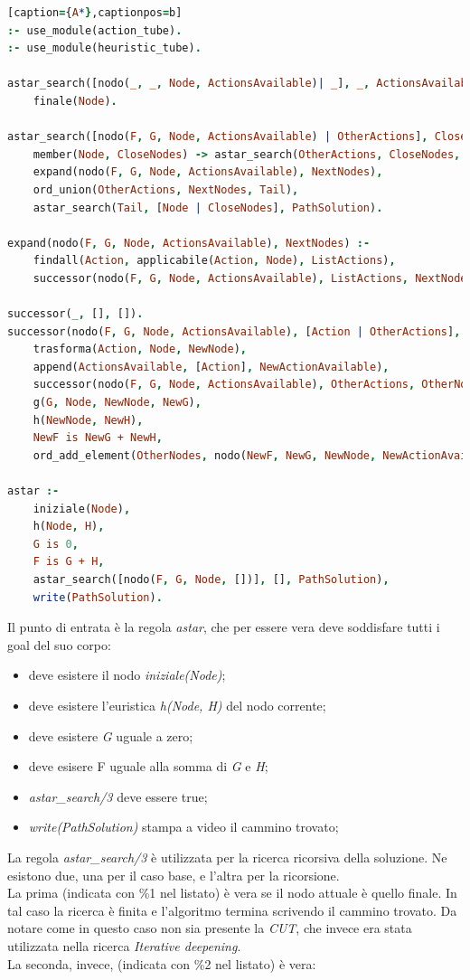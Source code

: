 \documentclass[12pt]{report}
\begin{document}
\begin{lstlisting}[language=Prolog][caption={A*},captionpos=b]
:- use_module(action_tube).
:- use_module(heuristic_tube).

astar_search([nodo(_, _, Node, ActionsAvailable)| _], _, ActionsAvailable) :- %1
	finale(Node).

astar_search([nodo(F, G, Node, ActionsAvailable) | OtherActions], CloseNodes, PathSolution) :- %2
	member(Node, CloseNodes) -> astar_search(OtherActions, CloseNodes, PathSolution);
	expand(nodo(F, G, Node, ActionsAvailable), NextNodes),
	ord_union(OtherActions, NextNodes, Tail),
	astar_search(Tail, [Node | CloseNodes], PathSolution). 

expand(nodo(F, G, Node, ActionsAvailable), NextNodes) :-
	findall(Action, applicabile(Action, Node), ListActions),
	successor(nodo(F, G, Node, ActionsAvailable), ListActions, NextNodes)

successor(_, [], []).
successor(nodo(F, G, Node, ActionsAvailable), [Action | OtherActions], Successors) :-
	trasforma(Action, Node, NewNode),
	append(ActionsAvailable, [Action], NewActionAvailable),
	successor(nodo(F, G, Node, ActionsAvailable), OtherActions, OtherNodes),
	g(G, Node, NewNode, NewG),
	h(NewNode, NewH),
	NewF is NewG + NewH,
	ord_add_element(OtherNodes, nodo(NewF, NewG, NewNode, NewActionAvailable), Successors).

astar :-
	iniziale(Node),
	h(Node, H),
	G is 0,
	F is G + H,
	astar_search([nodo(F, G, Node, [])], [], PathSolution),
	write(PathSolution).
\end{lstlisting}

Il punto di entrata è la regola \emph{astar}, che per essere vera deve soddisfare tutti i goal del suo corpo:

\begin{itemize}
\item deve esistere il nodo \emph{iniziale(Node)};
\item deve esistere l'euristica \emph{h(Node, H)} del nodo corrente;
\item deve esistere \emph{G} uguale a zero;
\item deve esisere F uguale alla somma di \emph{G} e \emph{H};
\item \emph{astar\_search/3} deve essere true;
\item \emph{write(PathSolution)} stampa a video il cammino trovato;
\end{itemize}

La regola \emph{astar\_search/3} \`e utilizzata per la ricerca ricorsiva della soluzione. Ne esistono due, una per il caso base, e l'altra per la ricorsione.\\
La prima (indicata con \%1 nel listato) \`e vera se il nodo attuale \`e quello finale. In tal caso la ricerca \`e finita e l'algoritmo termina scrivendo il cammino trovato. Da notare come in questo caso non sia presente la \emph{CUT}, che invece era stata utilizzata nella ricerca \emph{Iterative deepening}.\\
La seconda, invece, (indicata con \%2 nel listato) \`e vera:
\end{document}
